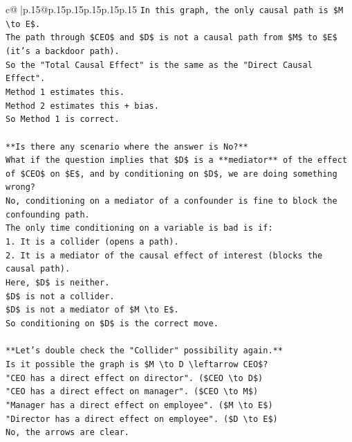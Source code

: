 \documentclass{article}
\begin{document}
{\begin{supertabular}{c@{$\;$}|p{.15\linewidth}@{}p{.15\linewidth}p{.15\linewidth}p{.15\linewidth}p{.15\linewidth}p{.15\linewidth}}
{{{\texttt{In this graph, the only causal path is \$M \textbackslash{}to E\$.} \\
\texttt{The path through \$CEO\$ and \$D\$ is not a causal path from \$M\$ to \$E\$ (it's a backdoor path).} \\
\texttt{So the "Total Causal Effect" is the same as the "Direct Causal Effect".} \\
\texttt{Method 1 estimates this.} \\
\texttt{Method 2 estimates this + bias.} \\
\texttt{So Method 1 is correct.} \\
\\ 
\texttt{**Is there any scenario where the answer is No?**} \\
\texttt{What if the question implies that \$D\$ is a **mediator** of the effect of \$CEO\$ on \$E\$, and by conditioning on \$D\$, we are doing something wrong?} \\
\texttt{No, conditioning on a mediator of a confounder is fine to block the confounding path.} \\
\texttt{The only time conditioning on a variable is bad is if:} \\
\texttt{1. It is a collider (opens a path).} \\
\texttt{2. It is a mediator of the causal effect of interest (blocks the causal path).} \\
\texttt{Here, \$D\$ is neither.} \\
\texttt{\$D\$ is not a collider.} \\
\texttt{\$D\$ is not a mediator of \$M \textbackslash{}to E\$.} \\
\texttt{So conditioning on \$D\$ is the correct move.} \\
\\ 
\texttt{**Let's double check the "Collider" possibility again.**} \\
\texttt{Is it possible the graph is \$M \textbackslash{}to D \textbackslash{}leftarrow CEO\$?} \\
\texttt{"CEO has a direct effect on director". (\$CEO \textbackslash{}to D\$)} \\
\texttt{"CEO has a direct effect on manager". (\$CEO \textbackslash{}to M\$)} \\
\texttt{"Manager has a direct effect on employee". (\$M \textbackslash{}to E\$)} \\
\texttt{"Director has a direct effect on employee". (\$D \textbackslash{}to E\$)} \\
\texttt{No, the arrows are clear.} \\
}}}
\end{supertabular}}
\end{document}
